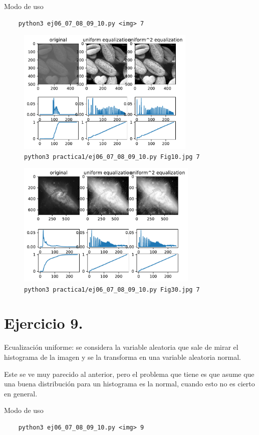 \documentclass[11pt, spanish]{article}
\begin{document}
Modo de uso
\begin{verbatim}
    python3 ej06_07_08_09_10.py <img> 7
\end{verbatim}

\begin{figure}[H]
\centering
  \includegraphics[height=6cm]{informe-imgs/ej07-1.pdf}
  \caption{\texttt{python3 practica1/ej06\_07\_08\_09\_10.py Fig10.jpg 7}}
\end{figure}

\begin{figure}[H]
\centering
  \includegraphics[height=6cm]{informe-imgs/ej07-2.pdf}
  \caption{\texttt{python3 practica1/ej06\_07\_08\_09\_10.py Fig30.jpg 7}}
\end{figure}


\section{Ejercicio 9.}
Ecualización uniforme: se considera la variable aleatoria que sale de mirar el histograma de la imagen y se la
transforma en una variable aleatoria normal.

Este se ve muy parecido al anterior, pero el problema que tiene es que asume que una buena
distribución para un histograma es la normal, cuando esto no es cierto en general.

Modo de uso
\begin{verbatim}
    python3 ej06_07_08_09_10.py <img> 9
\end{verbatim}
\end{document}
